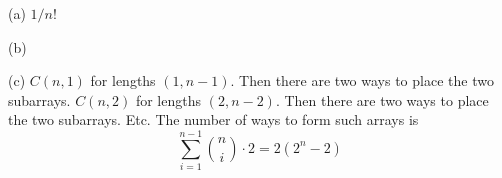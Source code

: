 (a) $1/n!$

(b)

(c) $C(n,1)$ for lengths $(1, n-1)$. Then there are two ways to place the two subarrays.
$C(n,2)$ for lengths $(2, n-2)$. Then there are two ways to place the two subarrays.
Etc.
The number of ways to form such arrays is
\[
  \sum_{i = 1}^{n - 1} \binom{n}{i} \cdot 2 = 2(2^n - 2)
\]
    
